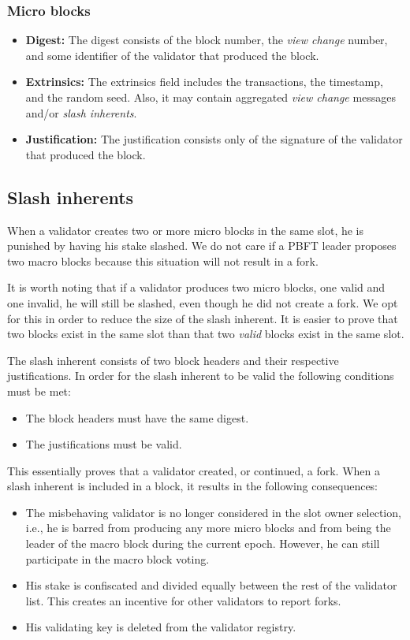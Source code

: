 \documentclass[conference]{IEEEtran}
\begin{document}
\subsubsection{Micro blocks}
\begin{itemize}
	\item \textbf{Digest:} The digest consists of the block number, the \textit{view change} number, and some identifier of the validator that produced the block.
	\item \textbf{Extrinsics:} The extrinsics field includes the transactions, the timestamp, and the random seed. Also, it may contain aggregated \textit{view change} messages and/or \textit{slash inherents}.
	\item \textbf{Justification:} The justification consists only of the signature of the validator that produced the block.
\end{itemize}

\subsection{Slash inherents}
When a validator creates two or more micro blocks in the same slot, he is punished by having his stake slashed. We do not care if a PBFT leader proposes two macro blocks because this situation will not result in a fork.

It is worth noting that if a validator produces two micro blocks, one valid and one invalid, he will still be slashed, even though he did not create a fork. We opt for this in order to reduce the size of the slash inherent. It is easier to prove that two blocks exist in the same slot than that two \textit{valid} blocks exist in the same slot.

The slash inherent consists of two block headers and their respective justifications. In order for the slash inherent to be valid the following conditions must be met:

\begin{itemize}
	\item The block headers must have the same digest.
	\item The justifications must be valid.
\end{itemize}

This essentially proves that a validator created, or continued, a fork. When a slash inherent is included in a block, it results in the following consequences:

\begin{itemize}
	\item The misbehaving validator is no longer considered in the slot owner selection, i.e., he is barred from producing any more micro blocks and from being the leader of the macro block during the current epoch. However, he can still participate in the macro block voting.
	\item His stake is confiscated and divided equally between the rest of the validator list. This creates an incentive for other validators to report forks.
	\item His validating key is deleted from the validator registry.
\end{itemize}
\end{document}
